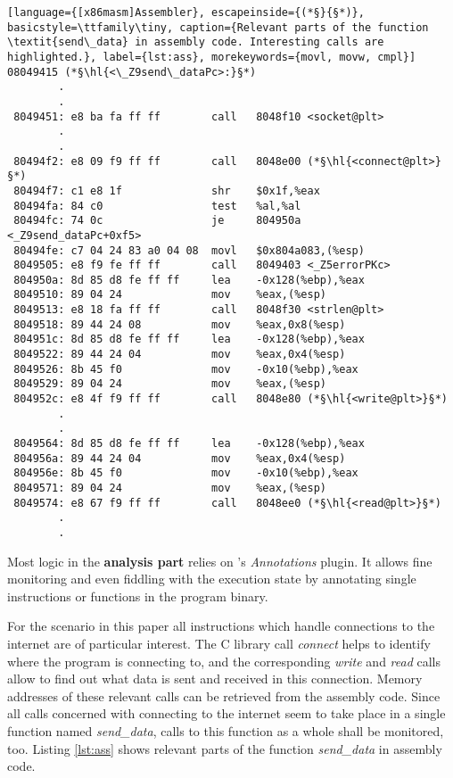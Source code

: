 \bigskip
\begin{lstlisting}[language={[x86masm]Assembler}, escapeinside={(*§}{§*)}, basicstyle=\ttfamily\tiny, caption={Relevant parts of the function \textit{send\_data} in assembly code. Interesting calls are highlighted.}, label={lst:ass}, morekeywords={movl, movw, cmpl}]
08049415 (*§\hl{<\_Z9send\_dataPc>:}§*)
		.
		.
 8049451: e8 ba fa ff ff       	call   8048f10 <socket@plt>
		.
		.
 80494f2: e8 09 f9 ff ff       	call   8048e00 (*§\hl{<connect@plt>}§*)
 80494f7: c1 e8 1f             	shr    $0x1f,%eax
 80494fa: 84 c0                	test   %al,%al
 80494fc: 74 0c                	je     804950a 					<_Z9send_dataPc+0xf5>
 80494fe: c7 04 24 83 a0 04 08 	movl   $0x804a083,(%esp)
 8049505: e8 f9 fe ff ff       	call   8049403 <_Z5errorPKc>
 804950a: 8d 85 d8 fe ff ff    	lea    -0x128(%ebp),%eax
 8049510: 89 04 24             	mov    %eax,(%esp)
 8049513: e8 18 fa ff ff       	call   8048f30 <strlen@plt>
 8049518: 89 44 24 08          	mov    %eax,0x8(%esp)
 804951c: 8d 85 d8 fe ff ff    	lea    -0x128(%ebp),%eax
 8049522: 89 44 24 04          	mov    %eax,0x4(%esp)
 8049526: 8b 45 f0             	mov    -0x10(%ebp),%eax
 8049529: 89 04 24             	mov    %eax,(%esp)
 804952c: e8 4f f9 ff ff       	call   8048e80 (*§\hl{<write@plt>}§*)
 		.
 		.
 8049564: 8d 85 d8 fe ff ff    	lea    -0x128(%ebp),%eax
 804956a: 89 44 24 04          	mov    %eax,0x4(%esp)
 804956e: 8b 45 f0             	mov    -0x10(%ebp),%eax
 8049571: 89 04 24             	mov    %eax,(%esp)
 8049574: e8 67 f9 ff ff       	call   8048ee0 (*§\hl{<read@plt>}§*)
		.
		.
\end{lstlisting}
\bigskip

Most logic in the \textbf{analysis part} relies on \sse's \textit{Annotations} plugin.
It allows fine monitoring and even fiddling with the execution state by annotating single instructions or functions in the program binary.

For the scenario in this paper all instructions which handle connections to the internet are of particular interest.
The C library call \textit{connect} helps to identify where the program is connecting to, and the corresponding \textit{write} and \textit{read} calls allow to find out what data is sent and received in this connection.
Memory addresses of these relevant calls can be retrieved from the assembly code.
Since all calls concerned with connecting to the internet seem to take place in a single function named \textit{send\_data}, calls to this function as a whole shall be monitored, too.
Listing \ref{lst:ass} shows relevant parts of the function \textit{send\_data} in assembly code.

